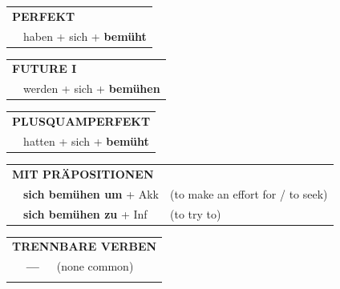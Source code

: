 \documentclass[10pt,a4paper]{revtex4-2}
\begin{document}
\begin{verbbox}
 \begin{tabular}{rl}
     \multicolumn{2}{l}{\textbf{PERFEKT}}\\
   & haben + sich + \textbf{bemüht}\\
  \end{tabular}
\hfill
   \begin{tabular}{rl}
   
    \multicolumn{2}{l}{\textbf{FUTURE I} }\\
   & werden + sich + \textbf{bemühen}\\
 
  \end{tabular}
\hfill
   \begin{tabular}{rl}
      \multicolumn{2}{l}{\textbf{PLUSQUAMPERFEKT}}\\
   & hatten + sich + \textbf{bemüht}\\
  \end{tabular}

   \vspace{10pt}

   \begin{tabular}{lll}
      \multicolumn{3}{l}{\textbf{MIT PRÄPOSITIONEN}}\\
& \textbf{sich bemühen um} + Akk & (to make an effort for / to seek)\\
& \textbf{sich bemühen zu} + Inf & (to try to)\\
\end{tabular}
  \hfill
   \begin{tabular}{lll}
      \multicolumn{3}{l}{\textbf{TRENNBARE VERBEN}}\\
 & \textbf{---} & (none common)\\
\vspace{10pt}
  \end{tabular}


  \vspace{-5pt}


\end{verbbox}
\end{document}
